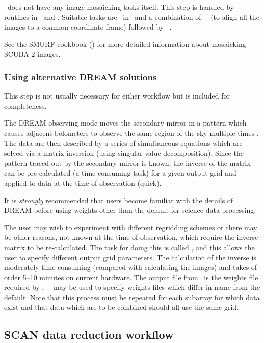 \documentclass[oneside,11pt]{starlink}
\begin{document}
\SMURF\ does not have any image mosaicking tasks itself. This step is
handled by routines in \KAPPA\ and \CCDPACK. Suitable tasks are
\wcsmosaic\ in \KAPPA\ and a combination of \KAPPA\ \wcsalign\ (to
align all the images to a common coordinate frame) followed by
\CCDPACK\ \makemos.

See the SMURF cookbook (\SMURFcook) for more detailed information
about mosaicking SCUBA-2 images.

\subsubsection{Using alternative DREAM solutions\label{se:dream}}

This step is not usually necessary for either workflow but is included
for completeness.

The DREAM observing mode moves the secondary mirror in a pattern which
causes adjacent bolometers to observe the same region of the sky
multiple times \cite{scuba2,dream}. The data are then described by a
series of simultaneous equations which are solved via a matrix
inversion (using singular value decomposition). Since the pattern
traced out by the secondary mirror is known, the inverse of the matrix
can be pre-calculated (a time-consuming task) for a given output grid
and applied to data at the time of observation (quick).

It is {\em strongly} recommended that users become familiar with the
details of DREAM \cite{dream} before using weights other than the
default for science data processing.

The user may wish to experiment with different regridding schemes or
there may be other reasons, not known at the time of observation,
which require the inverse matrix to be re-calculated. The task for
doing this is called \dreamweights, and this allows the user to
specify different output grid parameters. The calculation of the
inverse is moderately time-consuming (compared with calculating the
images) and takes of order 5--10 minutes on current hardware. The
output file from \dreamweights\ is the weights file required by
\dreamsolve. \KAPPA\ \fitsedit\ may be used to specify weights files
which differ in name from the default. Note that this process must be
repeated for each subarray for which data exist and that data which
are to be combined should all use the same grid.

\subsection{SCAN data reduction
  workflow\label{se:scanworkflow}}
\end{document}
